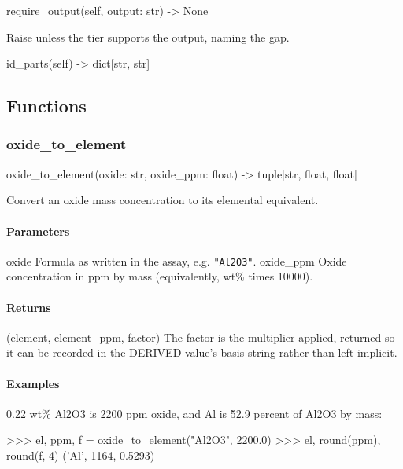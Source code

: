 \documentclass[10pt,a4paper,twoside]{report}
\begin{document}
\begin{verbatimsmall}
require_output(self, output: str) -> None
\end{verbatimsmall}

Raise unless the tier supports the output, naming the gap.

\begin{verbatimsmall}
id_parts(self) -> dict[str, str]
\end{verbatimsmall}

\subsection*{Functions}

\subsubsection*{oxide\_to\_element}

\begin{verbatimsmall}
oxide_to_element(oxide: str, oxide_ppm: float) -> tuple[str, float, float]
\end{verbatimsmall}

Convert an oxide mass concentration to its elemental equivalent.

\paragraph*{Parameters}

oxide Formula as written in the assay, e.g. \texttt{"Al2O3"}. oxide\_ppm Oxide concentration in ppm by mass (equivalently, wt\% times 10000).

\paragraph*{Returns}

(element, element\_ppm, factor) The factor is the multiplier applied, returned so it can be recorded in the DERIVED value's basis string rather than left implicit.

\paragraph*{Examples}

0.22 wt\% Al2O3 is 2200 ppm oxide, and Al is 52.9 percent of Al2O3 by mass:

\begin{doctestblock}
>>> el, ppm, f = oxide_to_element("Al2O3", 2200.0)
>>> el, round(ppm), round(f, 4)
('Al', 1164, 0.5293)
\end{doctestblock}
\end{document}
